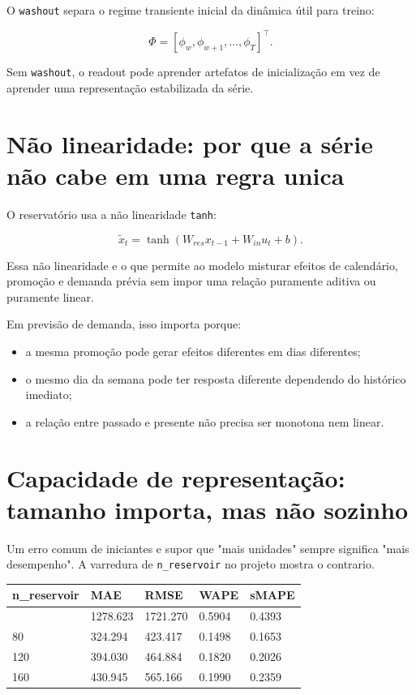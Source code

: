 \documentclass[12pt]{article}
\providecommand{\tightlist}{%
              \setlength{\itemsep}{0pt}\setlength{\parskip}{0pt}}
\begin{document}
O \texttt{washout} separa o regime transiente inicial da dinâmica útil para treino:

\[
\Phi = [\phi_w, \phi_{w+1}, \dots, \phi_T]^\top.
\]

Sem \texttt{washout}, o readout pode aprender artefatos de inicialização em vez de aprender uma representação estabilizada da série.

\section{Não linearidade: por que a série não cabe em uma regra unica}\label{3-nuxe3o-linearidade-por-que-a-suxe9rie-nuxe3o-cabe-em-uma-regra-unica}

O reservatório usa a não linearidade \texttt{tanh}:

\[
\widetilde{x}_t = \tanh(W_{res} x_{t-1} + W_{in} u_t + b).
\]

Essa não linearidade e o que permite ao modelo misturar efeitos de calendário, promoção e demanda prévia sem impor uma relação puramente aditiva ou puramente linear.

Em previsão de demanda, isso importa porque:

\begin{itemize}
\tightlist
\item
  a mesma promoção pode gerar efeitos diferentes em dias diferentes;
\item
  o mesmo dia da semana pode ter resposta diferente dependendo do histórico imediato;
\item
  a relação entre passado e presente não precisa ser monotona nem linear.
\end{itemize}

\section{Capacidade de representação: tamanho importa, mas não sozinho}\label{4-capacidade-de-representauxe7uxe3o-tamanho-importa-mas-nuxe3o-sozinho}

Um erro comum de iniciantes e supor que "mais unidades" sempre significa "mais desempenho". A varredura de \texttt{n\_reservoir} no projeto mostra o contrario.

\begin{longtable}[]{@{}lllll@{}}
\toprule\noalign{}
n\_reservoir & MAE & RMSE & WAPE & sMAPE \\
\midrule\noalign{}
\endhead
\bottomrule\noalign{}
\endlastfoot
40 & 1278.623 & 1721.270 & 0.5904 & 0.4393 \\
80 & 324.294 & 423.417 & 0.1498 & 0.1653 \\
120 & 394.030 & 464.884 & 0.1820 & 0.2026 \\
160 & 430.945 & 565.166 & 0.1990 & 0.2359 \\
\end{longtable}
\end{document}
